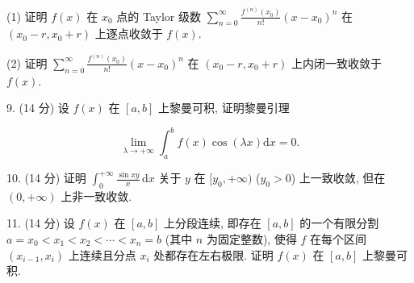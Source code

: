 \documentclass{examcollection}
\renewcommand{\displayformula}[1]{\[#1\]}
\begin{document}
{\begin{minipage}{\textwidth}
(1) 证明 $f(x)$ 在 $x_0$ 点的 Taylor 级数 $\sum_{n=0}^{\infty} \frac{f^{(n)}(x_0)}{n!}(x - x_0)^n$ 在 $(x_0 - r, x_0 + r)$ 上逐点收敛于 $f(x)$.\par
(2) 证明 $\sum_{n=0}^{\infty} \frac{f^{(n)}(x_0)}{n!}(x - x_0)^n$ 在 $(x_0 - r, x_0 + r)$ 上内闭一致收敛于 $f(x)$.\par
9. (14 分) 设 $f(x)$ 在 $[a, b]$ 上黎曼可积, 证明黎曼引理\par
\displayformula{\lim _ {\lambda \rightarrow + \infty} \int_ {a} ^ {b} f (x) \cos (\lambda x) \mathrm{d} x = 0.}\par
10. (14 分) 证明 $\int_0^{+\infty} \frac{\sin xy}{x} \, \mathrm{d}x$ 关于 $y$ 在 $[y_0, +\infty)$ ($y_0 > 0$) 上一致收敛, 但在 $(0, +\infty)$ 上非一致收敛.\par
11. (14 分) 设 $f(x)$ 在 $[a, b]$ 上分段连续, 即存在 $[a, b]$ 的一个有限分割 $a = x_0 < x_1 < x_2 < \cdots < x_n = b$ (其中 $n$ 为固定整数), 使得 $f$ 在每个区间 $(x_{i-1}, x_i)$ 上连续且分点 $x_i$ 处都存在左右极限. 证明 $f(x)$ 在 $[a, b]$ 上黎曼可积.\par
\end{minipage}}
\ifdim\dimexpr\ht\proofbox+\dp\proofbox\relax>\textheight
\noindent\resizebox{!}{\textheight}{\usebox{\proofbox}}\else\noindent\usebox{\proofbox}\fi\clearpage
\end{document}
